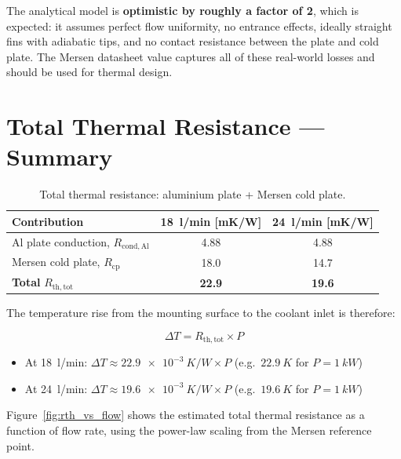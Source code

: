 \documentclass[a4paper,11pt]{article}
\begin{document}
The analytical model is \textbf{optimistic by roughly a factor of 2}, which is
expected: it assumes perfect flow uniformity, no entrance effects, ideally straight
fins with adiabatic tips, and no contact resistance between the plate and cold plate.
The Mersen datasheet value captures all of these real-world losses and should be used
for thermal design.

\section{Total Thermal Resistance --- Summary}

\begin{table}[H]
\centering
\caption{Total thermal resistance: aluminium plate + Mersen cold plate.}
\begin{tabular}{lcc}
\toprule
Contribution & \SI{18}{l/min} [\si{mK/W}] & \SI{24}{l/min} [\si{mK/W}] \\
\midrule
Al plate conduction, $R_{\mathrm{cond,Al}}$       & 4.88 & 4.88 \\
Mersen cold plate, $R_{\mathrm{cp}}$              & 18.0 & 14.7 \\
\midrule
\textbf{Total} $R_{\mathrm{th,tot}}$              & \textbf{22.9} & \textbf{19.6} \\
\bottomrule
\end{tabular}
\end{table}

The temperature rise from the mounting surface to the coolant inlet is therefore:

\begin{equation}
  \Delta T = R_{\mathrm{th,tot}} \times P
\end{equation}

\begin{itemize}
  \item At \SI{18}{l/min}: \quad
        $\Delta T \approx \SI{22.9e-3}{K/W} \times P$
        \quad (e.g.\ $\SI{22.9}{K}$ for $P = \SI{1}{kW}$)
  \item At \SI{24}{l/min}: \quad
        $\Delta T \approx \SI{19.6e-3}{K/W} \times P$
        \quad (e.g.\ $\SI{19.6}{K}$ for $P = \SI{1}{kW}$)
\end{itemize}

Figure~\ref{fig:rth_vs_flow} shows the estimated total thermal resistance as a
function of flow rate, using the power-law scaling from the Mersen reference point.
\end{document}

